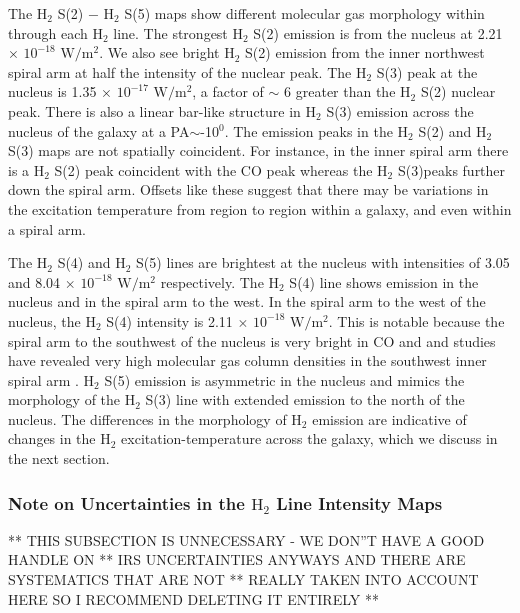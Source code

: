 \documentclass[manuscript]{aastex}
\begin{document}
The $\mathrm{ H_2}$ S(2) $-$ $\mathrm{H_2}$ S(5) maps show different
molecular gas morphology within  through each
$\mathrm{H_2}$ line.  The strongest $\mathrm{H_2}$ S(2) emission is
from the nucleus at 2.21 $\times$ $\mathrm{10^{-18}}$
$\mathrm{W/m^2}$.  We also see bright $\mathrm{H_2}$ S(2) emission
from the inner northwest spiral arm at half the intensity of the
nuclear peak.  The $\mathrm{H_2}$ S(3) peak at the nucleus is 1.35
$\times$ $\mathrm{10^{-17}}$ $\mathrm{W/m^2}$, a factor of $\sim$ 6
greater than the $\mathrm{H_2}$ S(2) nuclear peak.  There is also a
linear bar-like structure in $\mathrm{H_2}$ S(3) emission across the
nucleus of the galaxy at a PA$\sim$-10$^0$.  The emission peaks in the
$\mathrm{H_2}$ S(2) and $\mathrm{H_2}$ S(3) maps are not spatially
coincident.  For instance, in the inner spiral arm there is a
$\mathrm{H_2}$ S(2) peak coincident with the CO peak whereas the
$\mathrm{H_2}$ S(3)peaks further down the spiral arm.  Offsets like
these suggest that there may be variations in the excitation
temperature from region to region within a galaxy, and even within a
spiral arm.

The $\mathrm{H_2}$ S(4) and $\mathrm{H_2}$ S(5) lines are brightest at
the nucleus with intensities of 3.05 and 8.04 $\times$
$\mathrm{10^{-18}}$ $\mathrm{W/m^2}$ respectively.  The $\mathrm{H_2}$
S(4) line shows emission in the nucleus and in the spiral arm to the
west.  In the spiral arm to the west of the nucleus, the
$\mathrm{H_2}$ S(4) intensity is 2.11 $\times$ $\mathrm{10^{-18}}$
$\mathrm{W/m^2}$.  This is notable because the spiral arm to the
southwest of the nucleus is very bright in CO and and studies have
revealed very high molecular gas column densities in the southwest
inner spiral arm \citep{lor90}.  $\mathrm{H_2}$ S(5) emission is
asymmetric in the nucleus and mimics the morphology of the
$\mathrm{H_2}$ S(3) line with extended emission to the north of the
nucleus.  The differences in the morphology of $\mathrm{H_2}$ emission
are indicative of changes in the $\mathrm{H_2}$ excitation-temperature
across the galaxy, which we discuss in the next section.

\subsubsection{Note on Uncertainties in the $\mathrm{H_2}$ Line Intensity Maps}

** THIS SUBSECTION IS UNNECESSARY - WE DON''T HAVE A GOOD HANDLE ON
** IRS UNCERTAINTIES ANYWAYS AND THERE ARE SYSTEMATICS THAT ARE NOT
** REALLY TAKEN INTO ACCOUNT HERE SO I RECOMMEND DELETING IT ENTIRELY
** 
\end{document}
